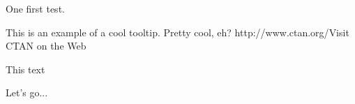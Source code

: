 \documentclass{article}
\begin{document}
One first test.

	{This is an example of a cool tooltip. Pretty cool, eh?}
	{http://www.ctan.org/}{Visit CTAN on the Web}
	{This text\strut}

Let's go...
\end{document}
